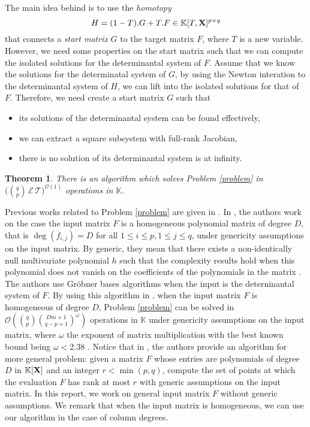 \documentclass[11pt]{article}
\numberwithin{Property}{section}
\newtheorem{Theorem}{Theorem}%
\numberwithin{Theorem}{section}
\numberwithin{Proposition}{section}
\numberwithin{Lemma}{section}
\numberwithin{Corollary}{section}
\numberwithin{Definition}{section}
\numberwithin{Remark}{section}
\numberwithin{Conjecture}{section}
\numberwithin{Problem}{section}
\numberwithin{Claim}{section}
\theoremstyle{definition}
\numberwithin{Example}{section}
\renewcommand{\leq}{\leqslant}
\newcommand{\bigO}[1]{\mathcal{O}(#1)} %
\newcommand{\expmatmul}{\omega} %
\newcommand{\field}{\mathbb{K}} %
\newcommand{\mat}[1]{\mathbf{\MakeUppercase{#1}}} %
\begin{document}
The main idea behind is to use the \emph{homotopy} 
\[H = (1-T).G + T.F \in \field[T, \mat{X}]^{p \times q}\]
that connects a \emph{start matrix} $G$ to the target matrix $F$, where $T$ is a new variable. However, we need some properties on the start matrix such that we can compute the isolated solutions for the determinantal system of $F$. Assume that we know the solutions for the determinatal system of $G$, by using the Newton interation to the determinantal system of $H$, we can lift into the isolated solutions for that of $F$. Therefore, we need create a start matrix $G$ such that
\begin{itemize}
\item its solutions of the determinantal system can be found effectively,
\item we can extract a square subsystem with full-rank Jacobian,
\item there is no solution of its determinantal system is at infinity. 
\end{itemize}
\begin{Theorem} There is an algorithm which solves Problem \ref{problem} in $\big({{q}\choose{p}} \,\mathcal{E}\,\mathcal{T}\big)^{\bigO{1}}$ operations in $\field$.
\end{Theorem}

Previous works related to Problem \ref{problem} are given in \cite{FauSafSpa13, Miller04, Spa14, SaSc16, NieRan09}. In \cite{FauSafSpa13}, the authors work on the case the input matrix $F$ is a homogeneous polynomial matrix of degree $D$, that is $\deg(f_{i,j}) = D$ for all $1 \leq i \leq p, 1 \leq j \leq q$, under genericity assumptions on the input matrix. By generic, they mean that there exists a non-identically null multivariate polynomial $h$ such that the complexity results hold when this polynomial does not vanish on the coefficients of the polynomials in the matrix \cite{FauSafSpa13}. The authors use Gröbner bases algorithms when the input is the deterninantal system of $F$. By using this algorithm in  \cite{FauSafSpa13}, when the input matrix $F$ is homogeneous of degree $D$, Problem \ref{problem} can be solved in $\bigO{{q \choose p}{{Dm+1} \choose {q-p+1}}^{\expmatmul}}$ operations in $\field$ under genericity assumptions on the input matrix, where $\expmatmul$ the exponent of matrix multiplication with the best known bound being $\expmatmul < 2.38$ \cite{CopWin90, LeGall14}. Notice that in \cite{FauSafSpa13}, the authors provide an algorithm for more general problem: given a matrix $F$ whose entries are polynomials of degree $D$ in $\field[\mat{X}]$ and an integer $r < \min(p,q)$, compute the set of points at which the evaluation $F$ has rank at most $r$ with generic assumptions on the input matrix. In this report, we work on general input matrix $F$ without generic assumptions. We remark that when the input matrix is homogeneous, we can use our algorithm in the case of column degrees. 
\end{document}
